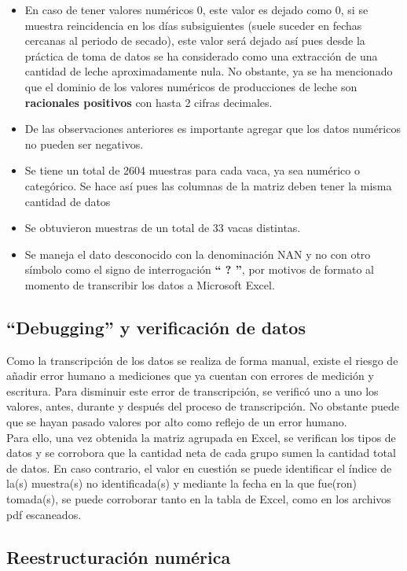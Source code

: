 \begin{itemize}
    \item En caso de tener valores numéricos 0, este valor es dejado como 0, si se muestra reincidencia en los días subsiguientes (suele suceder en fechas cercanas al periodo de secado), este valor será dejado así pues desde la práctica de toma de datos se ha considerado como una extracción de una cantidad de leche aproximadamente nula. No obstante, ya se ha mencionado que el dominio de los valores numéricos de producciones de leche son \textbf{racionales positivos} con hasta 2 cifras decimales.
    \item De las observaciones anteriores es importante agregar que los datos numéricos no pueden ser negativos.
    \item Se tiene un total de 2604 muestras para cada vaca, ya sea numérico o categórico. Se hace así pues las columnas de la matriz deben tener la misma cantidad de datos
    \item Se obtuvieron muestras de un total de 33 vacas distintas.
    \item Se maneja el dato desconocido con la denominación NAN y no con otro símbolo como el signo de interrogación \textbf{`` ? ''}, por motivos de formato al momento de transcribir los datos a Microsoft Excel.
\end{itemize}

\subsection{``Debugging'' y verificación de datos}

Como la transcripción de los datos se realiza de forma manual, existe el riesgo de añadir error humano a mediciones que ya cuentan con errores de medición y escritura. Para disminuir este error de transcripción, se verificó uno a uno los valores, antes, durante y después del proceso de transcripción. No obstante puede que se hayan pasado valores por alto como reflejo de un error humano.\\

Para ello, una vez obtenida la matriz agrupada en Excel, se verifican los tipos de datos y se corrobora que la cantidad neta de cada grupo sumen la cantidad total de datos. En caso contrario, el valor en cuestión se puede identificar el índice de la(s) muestra(s) no identificada(s) y mediante la fecha en la que fue(ron)  tomada(s), se puede corroborar tanto en la tabla de Excel, como en los archivos pdf escaneados. 

\subsection{Reestructuración numérica}

